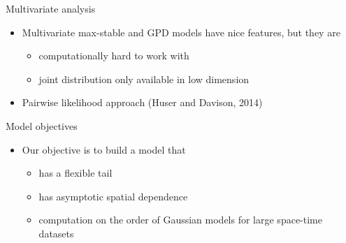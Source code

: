 \documentclass{beamer}
\begin{document}

\begin{frame}{Multivariate analysis}
  \begin{itemize} \setlength{\itemsep}{0.5em}
    \item Multivariate max-stable and GPD models have nice features, but they are
    \begin{itemize}
      \item computationally hard to work with
      \item joint distribution only available in low dimension
    \end{itemize}
    \item Pairwise likelihood approach (Huser and Davison, 2014)
  \end{itemize}
\end{frame}

\begin{frame}{Model objectives}
  \begin{itemize} \setlength{\itemsep}{0.5em}
    \item Our objective is to build a model that
    \begin{itemize}
      \item has a flexible tail
      \item has asymptotic spatial dependence
      \item computation on the order of Gaussian models for large space-time datasets
    \end{itemize}
  \end{itemize}
\end{frame}
\end{document}
